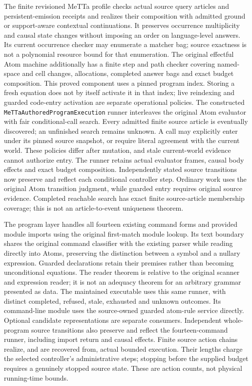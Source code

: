\documentclass[11pt]{article}
\newcommand{\code}[1]{\nolinkurl{#1}}
\begin{document}
The finite revisioned MeTTa profile checks actual source query articles and
persistent-emission receipts and realizes their composition with admitted
ground or support-aware contextual continuations. It preserves occurrence
multiplicity and causal state changes without imposing an order on
language-level answers. Its current occurrence checker may enumerate a matcher
bag; source exactness is not a polynomial resource bound for that enumeration.
The original effectful Atom machine additionally has a finite step and path
checker covering named-space and cell changes, allocations, completed answer
bags and exact budget composition. This proved component uses a pinned program
index. Storing a fresh equation does not by itself activate it in that index;
live reindexing and guarded code-entry activation are separate operational
policies. The constructed \code{MeTTaAuthoredProgramExecution} runner interleaves
the original Atom evaluator with fair conditional-call search. Every admitted
finite source article is eventually discovered; an unfinished search remains
unknown. A call may explicitly enter under its pinned source snapshot, or
require literal agreement with the current world. These policies differ after
mutation, and stale current-world evidence cannot authorize entry. The runner
retains actual evaluator frames, causal body effects and exact budget
composition. Independently stated source transitions now preserve and reflect
each conditional controller step. Ordinary work uses the original Atom
transition judgment, while guarded entry requires original source evidence.
Completed reachable search has exact finite source-article membership
coverage; this is not an article-to-event uniqueness theorem.

The program layer handles all fourteen existing command forms and provided
module imports using the original first-match module lookup. Its text boundary
shares the original command classifier with the existing parser while reading
directly into Atoms, preserving the distinction between a symbol and a nullary
expression. Guarded declarations retain their premises rather than becoming
unconditional equations. The reader theorem is relative to the original
scanner and expression reader; it is not an adequacy theorem for an arbitrary
grammar presented as data. The maintained executable uses this same runner,
with distinct completed, refused, stale, exhausted and unknown outcomes.
Its command-line module uses the source-owned guarded atom-rule service
directly. Optional candidate representations are separate consumers.
Independent whole-program source transitions also preserve and reflect the
fourteen-command runner, including import return and causal effects. Finite
source action chains realize, and are recovered from, actual bounded
execution. Their lengths charge the selected controller's administrative
steps; stopping before the supplied budget requires a genuinely stopped
source state. These are action counts, not physical running-time bounds.
\end{document}

